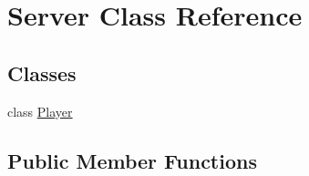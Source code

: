 \hypertarget{class_server}{
\section{Server Class Reference}
\label{class_server}
}
\subsection*{Classes}
\begin{DoxyCompactItemize}
\item 
class \hyperlink{class_server_1_1_player}{Player}
\end{DoxyCompactItemize}
\subsection*{Public Member Functions}
